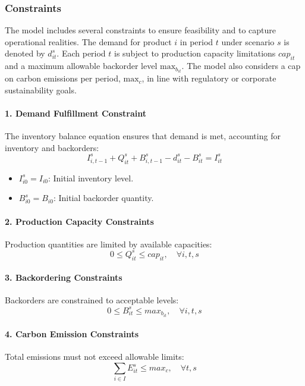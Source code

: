 \documentclass[final,3p,times,review,authoryear]{elsarticle}
\begin{document}
\subsubsection{Constraints}
The model includes several constraints to ensure feasibility and to capture operational realities. The demand for product \( i \) in period \( t \) under scenario \( s \) is denoted by \( d_{it}^s \). Each period \( t \) is subject to production capacity limitations \( cap_{it} \) and a maximum allowable backorder level \( \mathrm{max}_{b_{it}} \). The model also considers a cap on carbon emissions per period, \( \mathrm{max}_c \), in line with regulatory or corporate sustainability goals.

\paragraph{1. Demand Fulfillment Constraint}
The inventory balance equation ensures that demand is met, accounting for inventory and backorders:
\begin{equation}
\label{eq:demand_constraint}
I_{i,t-1}^s + Q_{it}^s + B_{i,t-1}^s - d_{it}^s - B_{it}^s = I_{it}^s
\end{equation}
\begin{itemize}
\item $I_{i0}^s = I_{i0}$: Initial inventory level.
\item $B_{i0}^s = B_{i0}$: Initial backorder quantity.
\end{itemize}

\paragraph{2. Production Capacity Constraints}
Production quantities are limited by available capacities:
\begin{equation}
\label{eq:capacity_constraint}
0 \leq Q_{it}^s \leq cap_{it}, \quad \forall i, t, s
\end{equation}

\paragraph{3. Backordering Constraints}
Backorders are constrained to acceptable levels:
\begin{equation}
\label{eq:backorder_constraint}
0 \leq B_{it}^s \leq \mathit{max}_{b_{it}}, \quad \forall i, t, s
\end{equation}

\paragraph{4. Carbon Emission Constraints}
Total emissions must not exceed allowable limits:
\begin{equation}
\label{eq:emission_constraint}
\sum_{i \in I} E_{it}^s \leq \mathit{max}_c, \quad \forall t, s
\end{equation}
\end{document}
